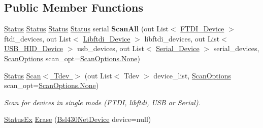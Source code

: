 \subsection*{Public Member Functions}
\begin{DoxyCompactItemize}
\item 
\mbox{\label{interface_b_s_l430___n_e_t_1_1_i_bsl430_net_a1606c2050b2244c9c5558b55f31a76ae}} 
\mbox{\hyperlink{class_b_s_l430___n_e_t_1_1_status}{Status}} \mbox{\hyperlink{class_b_s_l430___n_e_t_1_1_status}{Status}} \mbox{\hyperlink{class_b_s_l430___n_e_t_1_1_status}{Status}} \mbox{\hyperlink{class_b_s_l430___n_e_t_1_1_status}{Status}} serial {\bfseries Scan\+All} (out List$<$ \mbox{\hyperlink{class_b_s_l430___n_e_t_1_1_comm_1_1_f_t_d_i___device}{F\+T\+D\+I\+\_\+\+Device}} $>$ ftdi\+\_\+devices, out List$<$ \mbox{\hyperlink{class_b_s_l430___n_e_t_1_1_comm_1_1_libftdi___device}{Libftdi\+\_\+\+Device}} $>$ libftdi\+\_\+devices, out List$<$ \mbox{\hyperlink{class_b_s_l430___n_e_t_1_1_comm_1_1_u_s_b___h_i_d___device}{U\+S\+B\+\_\+\+H\+I\+D\+\_\+\+Device}} $>$ usb\+\_\+devices, out List$<$ \mbox{\hyperlink{class_b_s_l430___n_e_t_1_1_comm_1_1_serial___device}{Serial\+\_\+\+Device}} $>$ serial\+\_\+devices, \mbox{\hyperlink{namespace_b_s_l430___n_e_t_a4cd6f8166a2a97ccb3405df2287d4ba8}{Scan\+Options}} scan\+\_\+opt=\mbox{\hyperlink{namespace_b_s_l430___n_e_t_a4cd6f8166a2a97ccb3405df2287d4ba8a6adf97f83acf6453d4a6a4b1070f3754}{Scan\+Options.\+None}})
\item 
\mbox{\hyperlink{class_b_s_l430___n_e_t_1_1_status}{Status}} \mbox{\hyperlink{interface_b_s_l430___n_e_t_1_1_i_bsl430_net_ab6f53bec39332434e99912ce3413dbcd}{Scan$<$ Tdev $>$}} (out List$<$ Tdev $>$ device\+\_\+list, \mbox{\hyperlink{namespace_b_s_l430___n_e_t_a4cd6f8166a2a97ccb3405df2287d4ba8}{Scan\+Options}} scan\+\_\+opt=\mbox{\hyperlink{namespace_b_s_l430___n_e_t_a4cd6f8166a2a97ccb3405df2287d4ba8a6adf97f83acf6453d4a6a4b1070f3754}{Scan\+Options.\+None}})
\begin{DoxyCompactList}\small\item\em Scan for devices in single mode (F\+T\+DI, libftdi, U\+SB or Serial). \end{DoxyCompactList}\item 
\mbox{\hyperlink{class_b_s_l430___n_e_t_1_1_status_ex}{Status\+Ex}} \mbox{\hyperlink{interface_b_s_l430___n_e_t_1_1_i_bsl430_net_af85d5a5f5f2b4bfb577ba5c16d268252}{Erase}} (\mbox{\hyperlink{class_b_s_l430___n_e_t_1_1_bsl430_net_device}{Bsl430\+Net\+Device}} device=null)

\end{DoxyCompactItemize}
